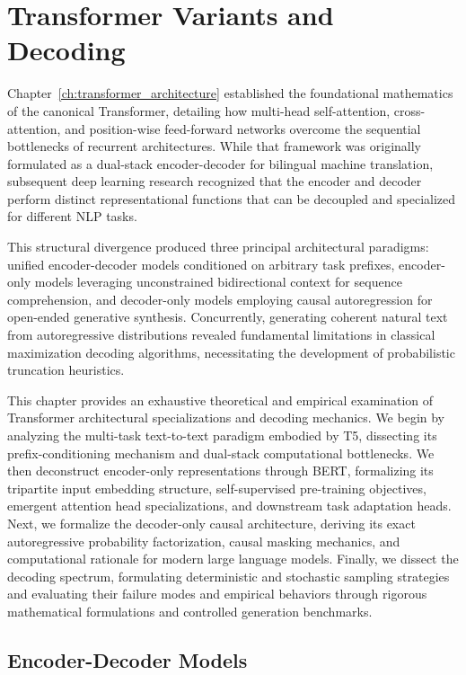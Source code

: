 \documentclass[../../../main.tex]{subfiles}
\begin{document}
\chapter{Transformer Variants and Decoding}
\label{ch:transformer_variants}

Chapter~\ref{ch:transformer_architecture} established the foundational mathematics of the canonical Transformer, detailing how multi-head self-attention, cross-attention, and position-wise feed-forward networks overcome the sequential bottlenecks of recurrent architectures. While that framework was originally formulated as a dual-stack encoder-decoder for bilingual machine translation, subsequent deep learning research recognized that the encoder and decoder perform distinct representational functions that can be decoupled and specialized for different NLP tasks.

This structural divergence produced three principal architectural paradigms: unified encoder-decoder models conditioned on arbitrary task prefixes, encoder-only models leveraging unconstrained bidirectional context for sequence comprehension, and decoder-only models employing causal autoregression for open-ended generative synthesis. Concurrently, generating coherent natural text from autoregressive distributions revealed fundamental limitations in classical maximization decoding algorithms, necessitating the development of probabilistic truncation heuristics.

This chapter provides an exhaustive theoretical and empirical examination of Transformer architectural specializations and decoding mechanics. We begin by analyzing the multi-task text-to-text paradigm embodied by T5, dissecting its prefix-conditioning mechanism and dual-stack computational bottlenecks. We then deconstruct encoder-only representations through BERT, formalizing its tripartite input embedding structure, self-supervised pre-training objectives, emergent attention head specializations, and downstream task adaptation heads. Next, we formalize the decoder-only causal architecture, deriving its exact autoregressive probability factorization, causal masking mechanics, and computational rationale for modern large language models. Finally, we dissect the decoding spectrum, formulating deterministic and stochastic sampling strategies and evaluating their failure modes and empirical behaviors through rigorous mathematical formulations and controlled generation benchmarks.


\section{Encoder-Decoder Models}
\label{sec:encoder_decoder_models}
\end{document}
